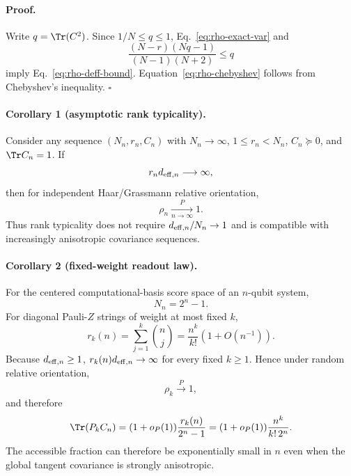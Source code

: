\paragraph{Proof.}
Write $q=\Tr(C^2)$.  Since $1/N\le q\le1$, Eq.~\eqref{eq:rho-exact-var} and
\begin{equation}
 \frac{(N-r)(Nq-1)}{(N-1)(N+2)}\le q
\end{equation}
imply Eq.~\eqref{eq:rho-deff-bound}.  Equation~\eqref{eq:rho-chebyshev} follows from Chebyshev's inequality. \hfill$\square$

\paragraph{Corollary 1 (asymptotic rank typicality).}
Consider any sequence $(N_n,r_n,C_n)$ with $N_n\to\infty$, $1\le r_n<N_n$, $C_n\succeq0$, and $\Tr C_n=1$.  If
\begin{equation}
 r_n d_{{\rm eff},n}\longrightarrow\infty,
\end{equation}
then for independent Haar/Grassmann relative orientation,
\begin{equation}
 \rho_n\xrightarrow[n\to\infty]{P}1.
\end{equation}
Thus rank typicality does not require $d_{{\rm eff},n}/N_n\to1$ and is compatible with increasingly anisotropic covariance sequences.

\paragraph{Corollary 2 (fixed-weight readout law).}
For the centered computational-basis score space of an $n$-qubit system,
\begin{equation}
 N_n=2^n-1.
\end{equation}
For diagonal Pauli-$Z$ strings of weight at most fixed $k$,
\begin{equation}
 r_k(n)=\sum_{j=1}^{k}{n\choose j}
 =\frac{n^k}{k!}\left(1+O(n^{-1})\right).
\end{equation}
Because $d_{{\rm eff},n}\ge1$, $r_k(n)d_{{\rm eff},n}\to\infty$ for every fixed $k\ge1$.  Hence under random relative orientation,
\begin{equation}
 \rho_k\xrightarrow{P}1,
\end{equation}
and therefore
\begin{equation}
 \Tr(P_kC_n)
 =(1+o_P(1))\frac{r_k(n)}{2^n-1}
 =(1+o_P(1))\frac{n^k}{k!\,2^n}.
 \label{eq:fixed-weight-exp-scaling}
\end{equation}
The accessible fraction can therefore be exponentially small in $n$ even when the global tangent covariance is strongly anisotropic.

